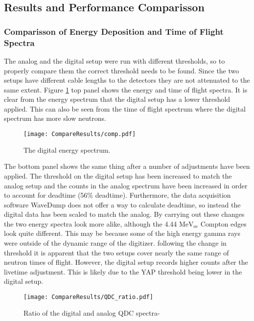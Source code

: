 \documentclass[main.tex]{subfiles}
\begin{document}
\subsection{Results and Performance Comparisson}\label{sec:results}
\subsubsection{Comparisson of Energy Deposition and Time of Flight Spectra}

The analog and the digital setup were run with different thresholds, so to properly compare them the correct threshold needs to be found. Since the two setups have different cable lengths to the detectors they are not attenuated to the same extent. Figure \ref{fig:AD_comp} top panel shows the energy and time of flight spectra. It is clear from the energy spectrum that the digital setup has a lower threshold applied. This can also be seen from the time of flight spectrum where the digital spectrum has more slow neutrons.
\begin{figure}[h]
    \centering
        \texttt{[image: CompareResults/comp.pdf]}
        \caption{The digital energy spectrum.}
    \label{fig:AD_comp}
\end{figure}


The bottom panel shows the same thing after a number of adjustments have been applied. The threshold on the digital setup has been increased to match the analog setup and the counts in the analog spectrum have been increased in order to account for deadtime (56\% deadtime). Furthermore, the data acquisition software WaveDump does not offer a way to calculate deadtime, so instead the digital data has been scaled to match the analog. By carrying out these changes the two energy spectra look more alike, although the 4.44 $\text{MeV}_\text{ee}$ Compton edges look quite different. This may be because some of the high energy gamma rays were outside of the dynamic range of the digitizer. following the change in threshold it is apparent that the two setups cover nearly the same range of neutron times of flight. However, the digital setup records higher counts after the livetime adjustment. This is likely due to the YAP threshold being lower in the digital setup.

\begin{figure}[h]
    \centering
        \texttt{[image: CompareResults/QDC\_ratio.pdf]}
        \caption{Ratio of the digital and analog QDC spectra-}
    \label{fig:qdc_ratio}
\end{figure}
\end{document}
